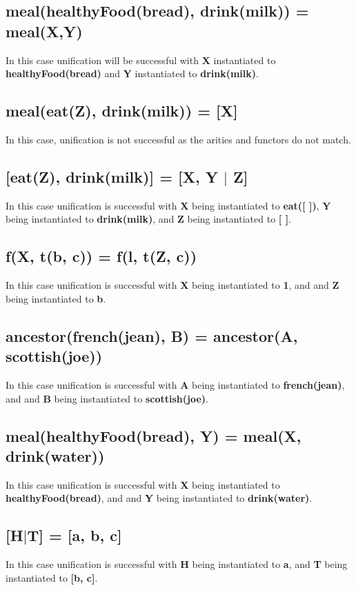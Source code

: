 \subsection{meal(healthyFood(bread), drink(milk)) = meal(X,Y)}
In this case unification will be successful with \textbf{X} instantiated to \textbf{healthyFood(bread)} and \textbf{Y} instantiated to \textbf{drink(milk)}.

\subsection{meal(eat(Z), drink(milk)) = [X]}
In this case, unification is not successful as the arities and functors do not match.

\subsection{[eat(Z), drink(milk)] = [X, Y $\mid$ Z]}
In this case unification is successful with \textbf{X} being instantiated to \textbf{eat([ ])}, \textbf{Y} being instantiated to \textbf{drink(milk)}, and \textbf{Z} being instantiated to \textbf{[ ]}.

\subsection{f(X, t(b, c)) = f(l, t(Z, c))}
In this case unification is successful with \textbf{X} being instantiated to \textbf{1}, and and \textbf{Z} being instantiated to \textbf{b}.

\subsection{ancestor(french(jean), B) = ancestor(A, scottish(joe))}
In this case unification is successful with \textbf{A} being instantiated to \textbf{french(jean)}, and and \textbf{B} being instantiated to \textbf{scottish(joe)}.

\subsection{meal(healthyFood(bread), Y) = meal(X, drink(water))}
In this case unification is successful with \textbf{X} being instantiated to \textbf{healthyFood(bread)}, and and \textbf{Y} being instantiated to \textbf{drink(water)}.

\subsection{[H$\mid$T] = [a, b, c]}
In this case unification is successful with \textbf{H} being instantiated to \textbf{a}, and \textbf{T} being instantiated to \textbf{[b, c]}.

